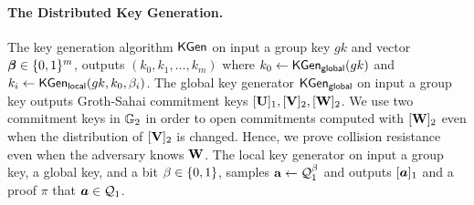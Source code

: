 
\paragraph{The Distributed Key Generation.} The key generation algorithm
$\mathsf{KGen}$ on input a group key $gk$ and vector ${\boldsymbol{\beta}}\in\{0,1\}^m$,  outputs $(k_0,k_1,\ldots,k_m)$ where $k_0 \gets \mathsf{KGen}_\mathsf{global}(gk)$ and  $k_i\gets \mathsf{KGen}_{\mathsf{local}}(gk,k_0,\beta_i)$. The global key generator $\mathsf{KGen}_\mathsf{global}$ on input a group key outputs Groth-Sahai commitment keys $[\mathbf{{U}}]_1,[\mathbf{{V}}]_2,[\mathbf{{W}}]_2$. We use two commitment keys in $\mathbb{G}_2$ in order to open commitments computed with $[\mathbf{{W}}]_2$ even when the distribution of $[\mathbf{{V}}]_2$ is changed. Hence, we prove collision resistance even when the adversary knows $\mathbf{{W}}$. The local key generator on input a group key, a global key, and a bit $\beta\in\{0,1\}$, samples $\mathbf{{a}}\gets\mathcal{Q}_1^\beta$ and outputs $[{\boldsymbol{a}}]_1$ and a proof $\pi$ that ${\boldsymbol{a}}\in\mathcal{Q}_1$.
